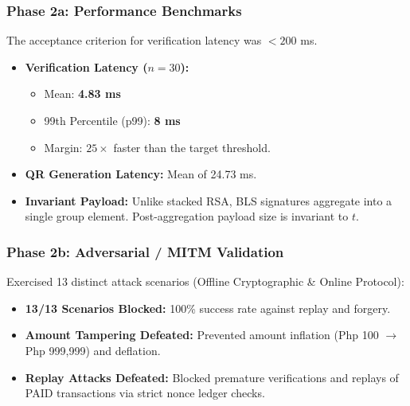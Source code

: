 \documentclass{beamer}
\begin{document}
\begin{frame}
  \frametitle{Phase 2a: Performance Benchmarks}
  The acceptance criterion for verification latency was $<200$ ms.
  \vspace{0.3cm}
  \begin{itemize}
      \item \textbf{Verification Latency ($n=30$):} 
      \begin{itemize}
          \item Mean: \textbf{4.83 ms} 
          \item 99th Percentile (p99): \textbf{8 ms}
          \item Margin: $25\times$ faster than the target threshold.
      \end{itemize}
      \item \textbf{QR Generation Latency:} Mean of 24.73 ms.
      \item \textbf{Invariant Payload:} Unlike stacked RSA, BLS signatures aggregate into a single group element. Post-aggregation payload size is invariant to $t$.
  \end{itemize}
\end{frame}

\begin{frame}
  \frametitle{Phase 2b: Adversarial / MITM Validation}
  Exercised 13 distinct attack scenarios (Offline Cryptographic \& Online Protocol):
  \vspace{0.3cm}
  \begin{itemize}
      \item \textbf{13/13 Scenarios Blocked:} 100\% success rate against replay and forgery.
      \item \textbf{Amount Tampering Defeated:} Prevented amount inflation (Php 100 $\rightarrow$ Php 999,999) and deflation.
      \item \textbf{Replay Attacks Defeated:} Blocked premature verifications and replays of PAID transactions via strict nonce ledger checks.
  \end{itemize}
\end{frame}

\end{document}

